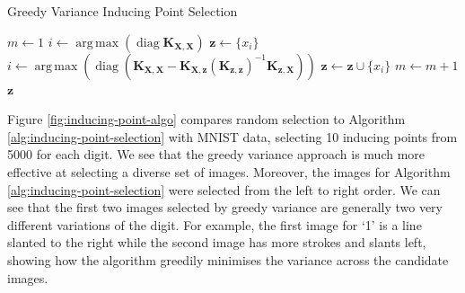 \documentclass{article}
\newcommand{\diag}{\operatorname{diag}}
\DeclareMathOperator*{\argmax}{arg\,max}
\numberwithin{equation}{section}
\begin{document}
\begin{algorithm}
\caption{Greedy Variance Inducing Point Selection}\label{alg:inducing-point-selection}
\begin{algorithmic}
\State $m \leftarrow 1$
 \State $i \leftarrow \argmax \left(\diag\mathbf{K}_{\mathbf{X}, \mathbf{X}}\right) $
 \State $\mathbf{z} \leftarrow \{x_i\}$
\State$i \leftarrow \argmax \left(\diag \left(\mathbf{K}_{\mathbf{X}, \mathbf{X}} - \mathbf{K}_{\mathbf{X}, \mathbf{z}} \left(\mathbf{K}_{\mathbf{z}, \mathbf{z}}\right)^{-1}\mathbf{K}_{\mathbf{z}, \mathbf{X}}\right)\right)$
 \State  $\mathbf{z} \leftarrow \mathbf{z} \cup \{x_i\}$
 \State  $m \leftarrow m+1$
\EndWhile
\State \Return $\mathbf{z}$
\end{algorithmic}
\end{algorithm}

Figure \ref{fig:inducing-point-algo} compares random selection to Algorithm \ref{alg:inducing-point-selection} with MNIST data, selecting 10 inducing points from 5000 for each digit. 
We see that the greedy variance approach is much more effective at selecting a diverse set of images.
Moreover, the images for Algorithm \ref{alg:inducing-point-selection} were selected from the left to right order.
We can see that the first two images selected by greedy variance are generally two very different variations of the digit.
For example, the first image for `1' is a line slanted to the right while the second image has more strokes and slants left, showing how the algorithm greedily minimises the variance across the candidate images.
\end{document}
